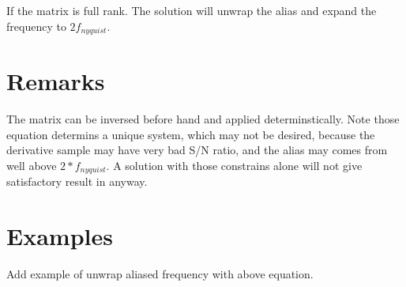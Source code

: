 \documentclass[12pt]{article}
\begin{document}
If the matrix is full rank. The solution will unwrap the alias and expand the frequency to $2f_{nyquist}$.

\section{Remarks}
The matrix can be inversed before hand and applied determinstically.
Note those equation determins a unique system, which may not be desired, because the derivative sample 
may have very bad S/N ratio, and the alias may comes from well above $2*f_{nyquist}$. 
A solution with those constrains alone will not give satisfactory result in anyway.

\section{Examples}
Add example of unwrap aliased frequency with above equation.

\end{document}

